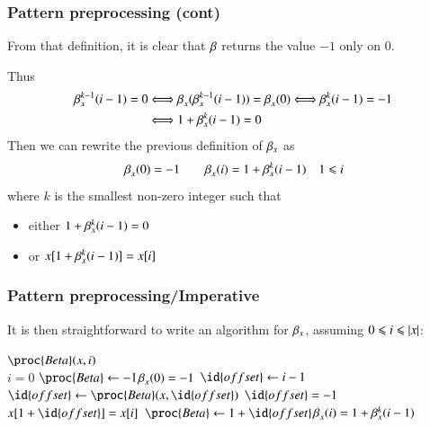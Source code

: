 %
\begin{frame}
\frametitle{Pattern preprocessing (cont)}

\label{beta_def}

From that definition, it is clear that \(\beta\) returns the value
\(-1\) only on \(0\).

\bigskip

Thus
\begin{align*}
  \beta_{x}^{k-1}(i-1) = 0
&\Longleftrightarrow
  \beta_{x}^{}(\beta_{x}^{k-1}(i-1)) = \beta_{x}^{}(0)
\Longleftrightarrow
  \beta_{x}^{k}(i-1) = -1\\
&\Longleftrightarrow
  1 + \beta_{x}^{k}(i-1) = 0
\end{align*}
Then we can rewrite the previous definition of \(\beta_{x}\) as
\[
\beta_{x}^{}(0) = -1 \qquad \beta_{x}^{}(i) = 1 + \beta_{x}^{k}(i-1)
\quad 1 \leqslant i
\]
where \(k\) is the smallest non-zero integer such that
\begin{itemize}

  \item either \(1 + \beta_{x}^{k}(i-1) = 0\)

  \item or \(x[1+\beta_{x}^{k}(i-1)] = x[i]\)

\end{itemize}

\end{frame}

%
\begin{frame}
\frametitle{Pattern preprocessing/Imperative}

It is then straightforward to write an algorithm for \(\beta_{x}\),
assuming \(0 \leqslant i \leqslant \lvert{x}\lvert{}\):
\begin{codebox}
\(\proc{Beta} (x, i)\)\\
\li \If \(i = 0\)
\li \Then \(\proc{Beta} \gets -1\)\RComment \(\beta_{x}^{}(0) = -1\)
\li \Else \(\id{offset} \gets i-1\)
\li       \Repeat
\li         \(\id{offset} \gets \proc{Beta}(x,\id{offset})\)
\li       \Until \(\id{offset} = -1\) \LogOr \(x[1+\id{offset}] = x[i]\)
\li       \(\proc{Beta} \gets 1 + \id{offset}\)\RComment \(\beta_{x}^{}(i)
= 1+\beta_{x}^{k}(i-1)\)
    \End
\end{codebox}

\end{frame}

